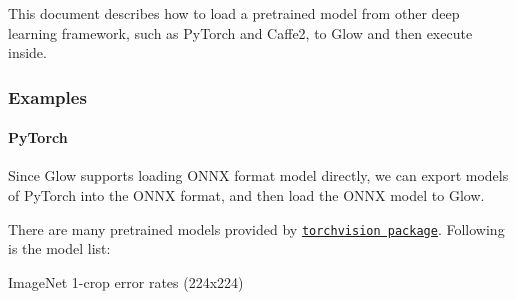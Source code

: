 This document describes how to load a pretrained model from other deep learning framework, such as Py\+Torch and Caffe2, to Glow and then execute inside.

\subsubsection*{Examples}

\paragraph*{Py\+Torch}

Since Glow supports loading O\+N\+NX format model directly, we can export models of Py\+Torch into the O\+N\+NX format, and then load the O\+N\+NX model to Glow.

There are many pretrained models provided by \href{https://pytorch.org/docs/stable/torchvision/models.html}{\tt torchvision package}. Following is the model list\+:

Image\+Net 1-\/crop error rates (224x224)

